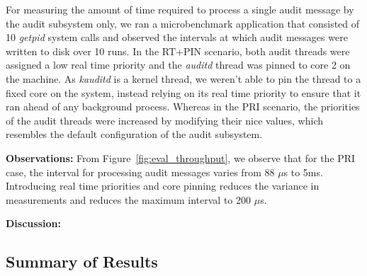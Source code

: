 For measuring the amount of time required to process a single audit message by the audit subsystem only, we ran a microbenchmark application that consisted of 10 \textit{getpid} system calls and observed the intervals at which audit messages were written to disk over 10 runs. In the RT+PIN scenario, both audit threads were assigned a low real time priority and the \textit{auditd} thread was pinned to core 2 on the machine. As \textit{kauditd} is a kernel thread, we weren't able to pin the thread to a fixed core on the system, instead relying on its real time priority to ensure that it ran ahead of any background process. Whereas in the PRI scenario, the priorities of the audit threads were increased by modifying their nice values, which resembles the default configuration of the audit subsystem.

\textbf{Observations:} From Figure~\ref{fig:eval_throughput}, we observe that for the PRI case, the interval for processing audit messages varies from 88 $\mu$s to 5ms. Introducing real time priorities and core pinning reduces the variance in measurements and reduces the maximum interval to 200 $\mu$s.

\textbf{Discussion:} 

\subsection{Summary of Results}
